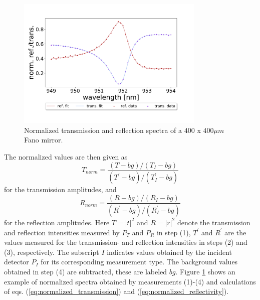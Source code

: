 \begin{figure}[h!]
    \centering
    \includegraphics[width=0.8\textwidth]{figures/norm_ref_and_trans_M3.pdf}
    \caption{Normalized transmission and reflection spectra of a $400$ x $400 \mu m$ Fano mirror.}
    \label{fig:normalized_ref_trans_spectra}
\end{figure}

The normalized values are then given as
\begin{equation}
    T_{norm} = \frac{(T-bg)/(T_I-bg)}{(T^{\prime}-bg)/(T_I^{\prime}-bg)}
    \label{eq:normalized_transmission}
\end{equation}
for the transmission amplitudes, and
\begin{equation}
    R_{norm} = \frac{(R-bg)/(R_I-bg)}{(R^{\prime}-bg)/(R_I^{\prime}-bg)}
    \label{eq:normalized_reflectivity}
\end{equation}
for the reflection amplitudes. Here $T=|t|^2$ and $R=|r|^2$ denote the transmission and reflection intensities measured by $P_T$ and $P_R$ in step (1), $T^{\prime}$ and $R^{\prime}$ are the values measured for the transmission- and reflection intensities in steps (2) and (3), respectively. The subscript $I$ indicates values obtained by the incident detector $P_I$ for its corresponding measurement type. The background values obtained in step (4) are subtracted, these are labeled $bg$. Figure \ref{fig:normalized_ref_trans_spectra} shows an example of normalized spectra obtained by measurements (1)-(4) and calculations of eqs. (\ref{eq:normalized_transmission}) and (\ref{eq:normalized_reflectivity}).

